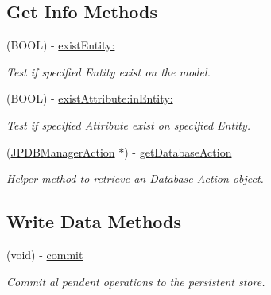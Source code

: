 \subsection*{Get Info Methods}
\begin{DoxyCompactItemize}
\item 
(BOOL) -\/ \hyperlink{interface_j_p_d_b_manager_a1d4236b0c842126f9ad6d30f53258a9f}{existEntity:}
\begin{DoxyCompactList}\small\item\em Test if specified Entity exist on the model. \item\end{DoxyCompactList}\item 
(BOOL) -\/ \hyperlink{interface_j_p_d_b_manager_a273547b21cbb031a49c35747e9240560}{existAttribute:inEntity:}
\begin{DoxyCompactList}\small\item\em Test if specified Attribute exist on specified Entity. \item\end{DoxyCompactList}\item 
(\hyperlink{interface_j_p_d_b_manager_action}{JPDBManagerAction} $\ast$) -\/ \hyperlink{interface_j_p_d_b_manager_a9eb7b1ed5ff3667b54a35a8d315cf689}{getDatabaseAction}
\begin{DoxyCompactList}\small\item\em Helper method to retrieve an \hyperlink{interface_j_p_d_b_manager_action}{Database Action} object. \item\end{DoxyCompactList}\end{DoxyCompactItemize}
\subsection*{Write Data Methods}
\begin{DoxyCompactItemize}
\item 
\hypertarget{interface_j_p_d_b_manager_ada5bce4a83f780c43da549468e1872dd}{
(void) -\/ \hyperlink{interface_j_p_d_b_manager_ada5bce4a83f780c43da549468e1872dd}{commit}}
\label{interface_j_p_d_b_manager_ada5bce4a83f780c43da549468e1872dd}

\begin{DoxyCompactList}\small\item\em Commit al pendent operations to the persistent store. \item\end{DoxyCompactList}\end{DoxyCompactItemize}


